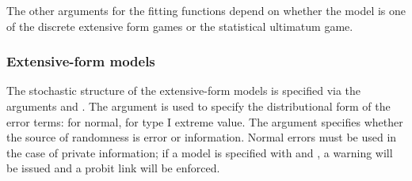 \documentclass[article]{jss}
\begin{document}
The other arguments for the fitting functions depend on whether the model is one
of the discrete extensive form games or the statistical ultimatum game.

\subsubsection{Extensive-form models}

The stochastic structure of the extensive-form models is specified via the
arguments  and .  The  argument is used to
specify the distributional form of the error terms:  for normal,
 for type I extreme value.  The  argument specifies
whether the source of randomness is  error or 
information.  Normal errors must be used in the case of private information; if
a model is specified with  and , a
warning will be issued and a probit link will be enforced.
\end{document}
